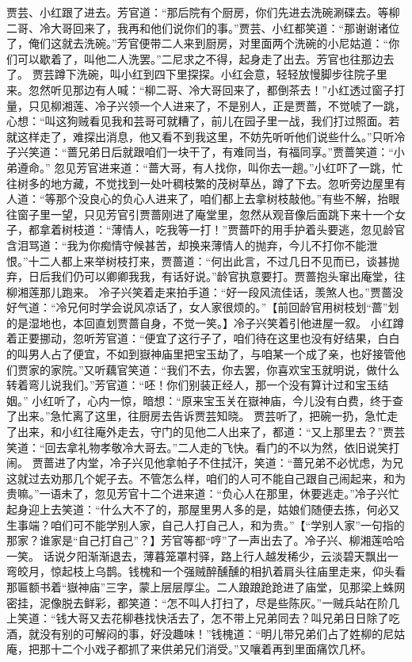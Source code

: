 \documentclass[12pt,oneside]{book}
\begin{document}
贾芸、小红跟了进去。芳官道：“那后院有个厨房，你们先进去洗碗涮碟去。等柳二哥、冷大哥回来了，我再和他们说你们的事。”贾芸、小红都笑道：“那谢谢诸位了，俺们这就去洗碗。”芳官便带二人来到厨房，对里面两个洗碗的小尼姑道：“你们可以歇着了，叫他二人洗罢。”二尼求之不得，起身走了出去。芳官也往那边去了。
贾芸蹲下洗碗，叫小红到四下里探探。小红会意，轻轻放慢脚步往院子里来。忽然听见那边有人喊：“柳二哥、冷大哥回来了，都倒茶去！”小红透过窗子打量，只见柳湘莲、冷子兴领一个人进来了，不是别人，正是贾蔷，不觉唬了一跳，心想：“叫这狗贼看见我和芸哥可就糟了，前儿在园子里一战，我们打过照面。若就这样走了，难探出消息，他又看不到我这里，不妨先听听他们说些什么。”只听冷子兴笑道：“蔷兄弟日后就跟咱们一块干了，有难同当，有福同享。”贾蔷笑道：“小弟遵命。”
忽见芳官进来道：“蔷大哥，有人找你，叫你去一趟。”小红吓了一跳，忙往树多的地方藏，不觉找到一处叶稠枝繁的茂树草丛，蹲了下去。忽听旁边屋里有人道：“等那个没良心的负心人进来了，咱们都上去拿树枝敲他。”有些不解，抬眼往窗子里一望，只见芳官引贾蔷刚进了庵堂里，忽然从观音像后面跳下来十一个女子，都拿着树枝道：“薄情人，吃我等一打！”贾蔷吓的用手护着头要逃，忽见龄官含泪骂道：“我为你痴情守候甚苦，却换来薄情人的抛弃，今儿不打你不能泄恨。”十二人都上来举树枝打来，贾蔷道：“何出此言，不过几日不见而已，谈甚抛弃，日后我们仍可以卿卿我我，有话好说。”龄官执意要打。贾蔷抱头窜出庵堂，往柳湘莲那儿跑来。
冷子兴笑着走来拍手道：“好一段风流佳话，羡煞人也。”贾蔷没好气道：“冷兄何时学会说风凉话了，女人家很烦的。”【前回龄官用树枝划“蔷”划的是湿地也，本回直划贾蔷自身，不觉一笑。】冷子兴笑着引他进屋一叙。
小红蹲着正要挪动，忽听芳官道：“便宜了这行子了，咱们待在这里也没有好结果，白白的叫男人占了便宜，不如到嶽神庙里把宝玉劫了，与咱某一个成了亲，也好接管他们贾家的家院。”又听藕官笑道：“我们不去，你去罢，你喜欢宝玉就明说，做什么转着弯儿说我们。”芳官道：“呸！你们别装正经人，那一个没有算计过和宝玉结姻。”
小红听了，心内一惊，暗想：“原来宝玉关在嶽神庙，今儿没有白费，终于查了出来。”急忙离了这里，往厨房去告诉贾芸知晓。
贾芸听了，把碗一扔，急忙走了出来，和小红往庵外走去，守门的见他二人出来了，都道：“又上那里去？”贾芸笑道：“回去拿礼物孝敬冷大哥去。”二人走的飞快。看门的不以为然，依旧说笑打闹。
贾蔷进了内堂，冷子兴见他拿帕子不住拭汗，笑道：“蔷兄弟不必忧虑，为兄这就过去劝那几个妮子去。不管怎么样，咱们的人可不能自己跟自己闹起来，和为贵嘛。”一语未了，忽见芳官十二个进来道：“负心人在那里，休要逃走。”冷子兴忙起身迎上去笑道：“什么大不了的，那屋里男人多的是，姑娘们随便去拣，何必又生事端？咱们可不能学别人家，自己人打自己人，和为贵。”【“学别人家”一句指的那家？谁家是“自己打自己”？】芳官等都“哼”了一声出去了。冷子兴、柳湘莲哈哈一笑。
话说夕阳渐渐退去，薄暮笼罩村驿，路上行人越发稀少，云淡碧天飘出一弯皎月，惊起枝上乌鹊。钱槐和一个强贼醉醺醺的相扒着肩头往庙里走来，仰头看那匾额书着“嶽神庙”三字，蒙上层层厚尘。二人踉踉跄跄进了庙堂，见那梁上蛛网密挂，泥像脱去鲜彩，都笑道：“怎不叫人打扫了，尽是些陈灰。”一贼兵站在阶几上笑道：“钱大哥又去花柳巷找快活去了，怎不带上兄弟同去？叫兄弟日日除了吃酒，就没有别的可解闷的事，好没趣味！”钱槐道：“明儿带兄弟们占了姓柳的尼姑庵，把那十二个小戏子都抓了来供弟兄们消受。”又嚷着再到里面痛饮几杯。
\end{document}
